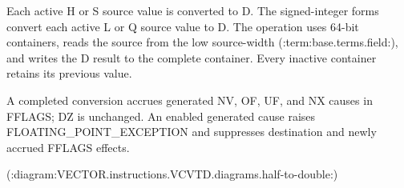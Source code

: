 Each active H or S source value is converted to D. The signed-integer forms
convert each active L or Q source value to D. The operation uses 64-bit
containers, reads the source from the low source-width (:term:base.terms.field:), and writes the D
result to the complete container. Every inactive container retains its
previous value.

A completed conversion accrues generated NV, OF, UF, and NX causes in FFLAGS;
DZ is unchanged. An enabled generated cause raises FLOATING\_POINT\_EXCEPTION and
suppresses destination and newly accrued FFLAGS effects.

(:diagram:VECTOR.instructions.VCVTD.diagrams.half-to-double:)
